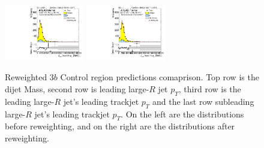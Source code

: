 \begin{figure}[htbp!]
\begin{center}
\includegraphics[width=0.31\textwidth,angle=-90]{figures/boosted/Prereweight/Moriond_ThreeTag_Control_sublHCand_trk0_Pt.pdf}
\includegraphics[width=0.31\textwidth,angle=-90]{figures/boosted/Control/b77_ThreeTag_Control_sublHCand_trk0_Pt.pdf}\\
\caption{Reweighted 3$b$ Control region predictions comaprison. Top row is the dijet Mass, second row is leading large-$R$ jet $p_{T}$, third row is the leading large-$R$ jet's leading trackjet $p_T$ and the last row subleading large-$R$ jet's leading trackjet $p_T$. On the left are the distributions before reweighting, and on the right are the distributions after reweighting.}
\label{fig:rw-3b-comp-cr}
\end{center}
\end{figure}


